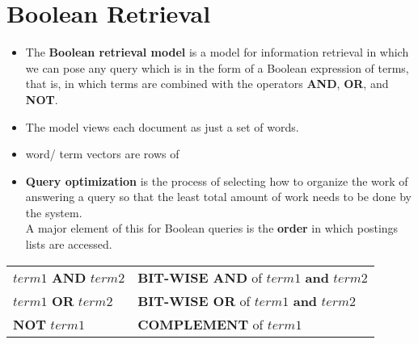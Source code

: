 \chapter{Boolean Retrieval \cite{ir-1}}\label{Boolean retrieval}

\begin{itemize}
    \item The \textbf{Boolean retrieval model} is a model for information retrieval in which we can pose any query which is in the form of a Boolean expression of terms, that is, in which terms are combined with the operators \textbf{AND}, \textbf{OR}, and \textbf{NOT}.

    \item The model views each document as just a set of words.

    \item word/ term vectors are rows of 

    \item \textbf{Query optimization} is the process of selecting how to organize the work of answering a query so that the least total amount of work needs to be done by the system.\\
    A major element of this for Boolean queries is the \textbf{order} in which postings lists are accessed.

\end{itemize}

\begin{table}[h]
    \centering
    \begin{tabular}{l l}
        $term1$ \textbf{AND} $term2$ & \textbf{BIT-WISE AND} of $term1$ \textbf{and} $term2$ \\
        $term1$ \textbf{OR} $term2$ & \textbf{BIT-WISE OR} of $term1$ \textbf{and} $term2$ \\
        \textbf{NOT} $term1$ & \textbf{COMPLEMENT} of $term1$
    \end{tabular}
\end{table}

